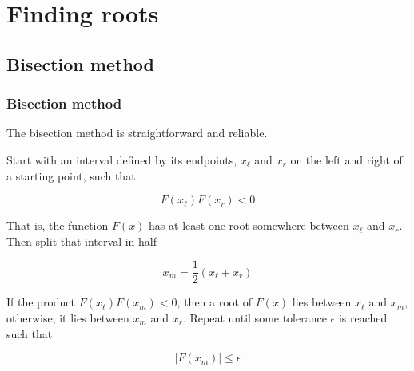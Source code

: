 \documentclass[hyperref={colorlinks=true}]{beamer}
\begin{document}
\section[Finding roots]{Finding roots}


\subsection[Bisection method]{Bisection method}

\begin{frame}%
  \frametitle{Bisection method}

  The bisection method is straightforward and reliable.
  
  \mysp 
  
  Start with an interval defined by its endpoints, $x_{\ell}$ and $x_{r}$ on the left and right of a starting point, such that
  
  \begin{equation}
    F(x_{\ell})F(x_{r}) < 0
  \end{equation}
  
  That is, the function $F(x)$ has at least one root somewhere between $x_{\ell}$ and $x_{r}$. Then split that interval in half
  
  \begin{equation}
    x_m = \frac{1}{2}(x_{\ell} + x_{r})
  \end{equation}
  
  If the product $F(x_{\ell})F(x_{m}) < 0$, then a root of $F(x)$ lies between $x_{\ell}$ and $x_{m}$, otherwise, it lies between $x_{m}$ and $x_{r}$. Repeat until some tolerance $\epsilon$ is reached such that
  
  \begin{equation}
   | F(x_{m}) | \leq \epsilon
  \end{equation}
  
\end{frame}

\end{document}
